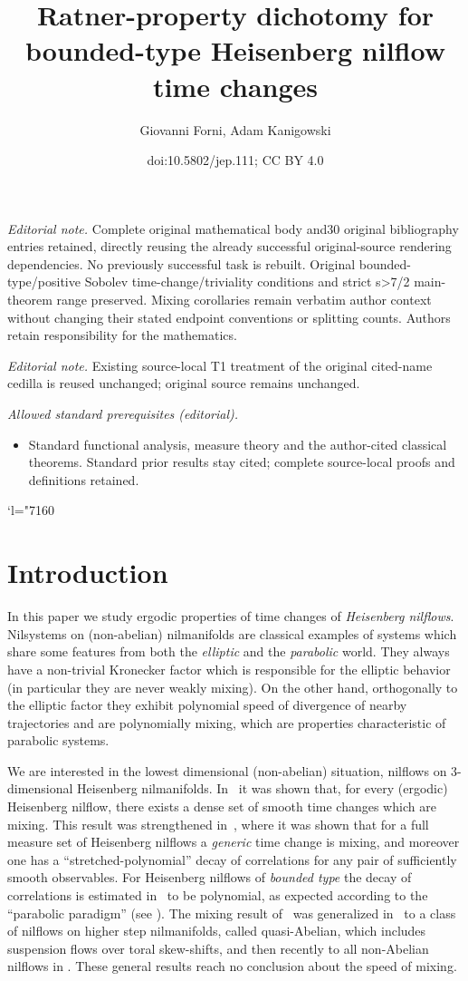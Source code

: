 \documentclass[10pt]{amsart}
\title{Ratner-property dichotomy for bounded-type Heisenberg nilflow time changes}
\author{Giovanni Forni, Adam Kanigowski}
\date{doi:10.5802/jep.111; CC BY 4.0}
\newcommand{\Changel}{\mathcode`l="7160}
\theoremstyle{definition}
\theoremstyle{plain}
\begin{document}
\maketitle
\noindent\textit{Editorial note.} Complete original mathematical body and30 original bibliography entries retained, directly reusing the already successful original-source rendering dependencies. No previously successful task is rebuilt. Original bounded-type/positive Sobolev time-change/triviality conditions and strict s>7/2 main-theorem range preserved. Mixing corollaries remain verbatim author context without changing their stated endpoint conventions or splitting counts. Authors retain responsibility for the mathematics.\par\medskip
\noindent\textit{Editorial note.} Existing source-local T1 treatment of the original cited-name cedilla is reused unchanged; original source remains unchanged.\par\medskip
\noindent\textit{Allowed standard prerequisites (editorial).}\begin{itemize}
\item Standard functional analysis, measure theory and the author-cited classical theorems. Standard prior results stay cited; complete source-local proofs and definitions retained.
\end{itemize}\medskip
\tableofcontents


\Changel
\section{Introduction}
In this paper we study ergodic properties of time changes of \emph{Heisenberg nilflows}. Nilsystems on (non-abelian) nilmanifolds are classical examples of systems which share some features from both the \emph{elliptic} and the \emph{parabolic} world. They always have a non-trivial Kronecker factor which is responsible for the elliptic behavior (in particular they are never weakly mixing). On the other hand, orthogonally to the elliptic factor they exhibit
polynomial speed of divergence of nearby trajectories and are polynomially mixing, which are properties characteristic of parabolic systems.

We are interested in the lowest dimensional (non-abelian) situation, \ie nilflows on $3$-dimensional Heisenberg nilmanifolds. In~\cite{AFU} it was shown that, for every (\hbox{ergodic}) Heisenberg nilflow, there exists a dense set of smooth time changes which are mixing. This result was strengthened in~\cite{FK}, where it was shown that for a full measure set of Heisenberg nilflows a \emph{generic} time change is mixing, and moreover one has a ``stretched-polynomial'' decay of correlations for any pair of sufficiently smooth observables. For Heisenberg nilflows of \emph{bounded type} the decay of correlations is estimated in~\cite{FK} to be polynomial, as expected according to the
``parabolic paradigm'' (see \cite[\S8.2.f]{HK}). The mixing result of~\cite{AFU} was generalized in~\cite{Rav} to a class of nilflows on higher step nilmanifolds, called quasi-Abelian, which includes suspension flows over toral skew-shifts, and then recently to all non-Abelian nilflows in \cite{AFRU}. These general results reach no conclusion about the speed of mixing.
\end{document}
